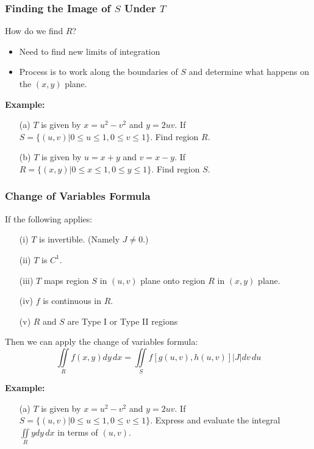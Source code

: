 \documentclass{beamer}
\begin{document}
\begin{frame}
\frametitle{Finding the Image of $S$ Under $T$}
How do we find $R$?
\begin{itemize}
	\item Need to find new limits of integration
	\item Process is to work along the boundaries of $S$ and determine what happens on the $(x,y)$ plane.
\end{itemize}
\textbf{Example:}
\begin{itemize}
	\item[(a)] $T$ is given by $x=u^2-v^2$ and $y=2uv$. If $S = \{ (u,v)| 0\leq u \leq 1, 0\leq v\leq1\}$. Find region $R$.
	\item[(b)] $T$ is given by $u=x+y$ and $v=x-y$. If $R = \{ (x,y)| 0\leq x \leq 1, 0\leq y\leq1\}$. Find region $S$.
\end{itemize}
\end{frame}

\begin{frame}
\frametitle{Change of Variables Formula}
If the following applies:
\begin{itemize}
	\item[(i)] $T$ is invertible. (Namely $J \neq 0$.)
	\item [(ii)] $T$ is $C^1$.
	\item[(iii)] $T$ maps region $S$ in $(u,v)$ plane onto region $R$ in $(x,y)$ plane.
	\item[(iv)] $f$ is continuous in $R$.
	\item[(v)] $R$ and $S$ are Type I or Type II regions
\end{itemize}
\vspace{12pt}
Then we can apply the change of variables formula:
$$\iint\limits_{R} f(x,y)dy\,dx = \iint\limits_{S} f[g(u,v),h(u,v)] |J| dv\,du$$

\textbf{Example:}
\begin{itemize}
	\item[(a)] $T$ is given by $x=u^2-v^2$ and $y=2uv$. If $S = \{ (u,v)| 0\leq u \leq 1, 0\leq v\leq1\}$. Express and evaluate the integral $\iint\limits_{R} y dy\,dx$ in terms of $(u,v)$.
\end{itemize}
\end{frame}
\end{document}
